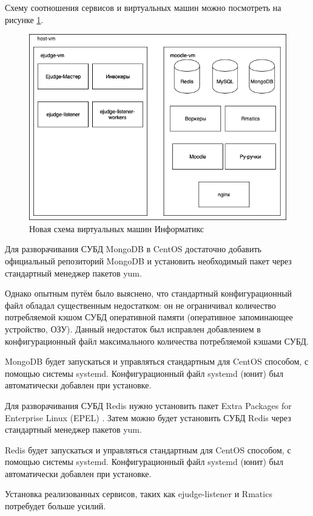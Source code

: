 Схему соотношения сервисов и виртуальных машин можно посмотреть на рисунке \ref{fig:new_vm}.

\begin{figure}
  \centering
  \includegraphics[width=\textwidth]{figures/new_vm.png}
  \caption{Новая схема виртуальных машин Информатикс}
  \label{fig:new_vm}
\end{figure}


Для разворачивания СУБД MongoDB в CentOS достаточно добавить официальный репозиторий MongoDB и установить необходимый пакет через стандартный менеджер пакетов yum.

Однако опытным путём было выяснено, что стандартный конфигурационный файл
обладал существенным недостатком: он не ограничивал количество потребляемой кэшом СУБД оперативной памяти (оперативное запоминающее устройство, ОЗУ).
Данный недостаток был исправлен добавлением в конфигурационный файл максимального количества потребляемой кэшами СУБД.

MongoDB будет запускаться и управляться стандартным для CentOS способом,
с помощью системы systemd.
Конфигурационный файл systemd (юнит) был автоматически добавлен при установке.

Для разворачивания СУБД Redis нужно установить пакет Extra Packages for Enterprise Linux (EPEL) \cite{redis_install}.
Затем можно будет установить СУБД Redis через стандартный менеджер пакетов yum.

Redis будет запускаться и управляться стандартным для CentOS способом,
с помощью системы systemd.
Конфигурационный файл systemd (юнит) был автоматически добавлен при установке.

Установка реализованных сервисов, таких как ejudge-listener и Rmatics потребудет больше усилий.

